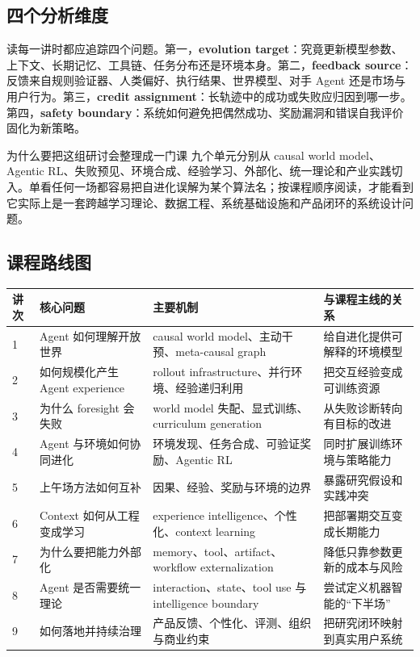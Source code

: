 \documentclass[a4paper]{article}
\begin{document}
\subsection{四个分析维度}

读每一讲时都应追踪四个问题。第一，\textbf{evolution target}：究竟更新模型参数、上下文、长期记忆、工具链、任务分布还是环境本身。第二，\textbf{feedback source}：反馈来自规则验证器、人类偏好、执行结果、世界模型、对手 Agent 还是市场与用户行为。第三，\textbf{credit assignment}：长轨迹中的成功或失败应归因到哪一步。第四，\textbf{safety boundary}：系统如何避免把偶然成功、奖励漏洞和错误自我评价固化为新策略。

\begin{knowledgebox}{为什么要把这组研讨会整理成一门课}
九个单元分别从 causal world model、Agentic RL、失败预见、环境合成、经验学习、外部化、统一理论和产业实践切入。单看任何一场都容易把自进化误解为某个算法名；按课程顺序阅读，才能看到它实际上是一套跨越学习理论、数据工程、系统基础设施和产品闭环的系统设计问题。
\end{knowledgebox}

\subsection{课程路线图}

\begin{longtable}{p{}p{}p{}p{}}
\toprule
讲次 & 核心问题 & 主要机制 & 与课程主线的关系 \\
\midrule
1 & Agent 如何理解开放世界 & causal world model、主动干预、meta-causal graph & 给自进化提供可解释的环境模型 \\
2 & 如何规模化产生 Agent experience & rollout infrastructure、并行环境、经验递归利用 & 把交互经验变成可训练资源 \\
3 & 为什么 foresight 会失败 & world model 失配、显式训练、curriculum generation & 从失败诊断转向有目标的改进 \\
4 & Agent 与环境如何协同进化 & 环境发现、任务合成、可验证奖励、Agentic RL & 同时扩展训练环境与策略能力 \\
5 & 上午场方法如何互补 & 因果、经验、奖励与环境的边界 & 暴露研究假设和实践冲突 \\
6 & Context 如何从工程变成学习 & experience intelligence、个性化、context learning & 把部署期交互变成长期能力 \\
7 & 为什么要把能力外部化 & memory、tool、artifact、workflow externalization & 降低只靠参数更新的成本与风险 \\
8 & Agent 是否需要统一理论 & interaction、state、tool use 与 intelligence boundary & 尝试定义机器智能的“下半场” \\
9 & 如何落地并持续治理 & 产品反馈、个性化、评测、组织与商业约束 & 把研究闭环映射到真实用户系统 \\
\bottomrule
\end{longtable}
\end{document}
